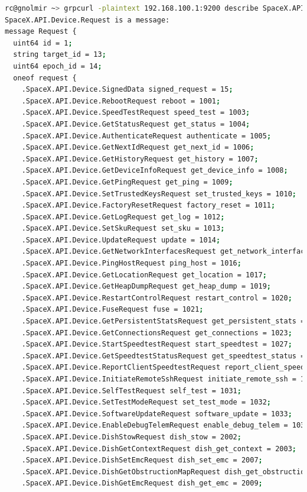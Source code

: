 \documentclass[IN,11pt,twoside,openright,bachelor,english]{tumthesis}
\begin{document}
\begin{lstlisting}[language=bash,basicstyle=\tiny]
rc@gnolmir ~> grpcurl -plaintext 192.168.100.1:9200 describe SpaceX.API.Device.Request
SpaceX.API.Device.Request is a message:
message Request {
  uint64 id = 1;
  string target_id = 13;
  uint64 epoch_id = 14;
  oneof request {
    .SpaceX.API.Device.SignedData signed_request = 15;
    .SpaceX.API.Device.RebootRequest reboot = 1001;
    .SpaceX.API.Device.SpeedTestRequest speed_test = 1003;
    .SpaceX.API.Device.GetStatusRequest get_status = 1004;
    .SpaceX.API.Device.AuthenticateRequest authenticate = 1005;
    .SpaceX.API.Device.GetNextIdRequest get_next_id = 1006;
    .SpaceX.API.Device.GetHistoryRequest get_history = 1007;
    .SpaceX.API.Device.GetDeviceInfoRequest get_device_info = 1008;
    .SpaceX.API.Device.GetPingRequest get_ping = 1009;
    .SpaceX.API.Device.SetTrustedKeysRequest set_trusted_keys = 1010;
    .SpaceX.API.Device.FactoryResetRequest factory_reset = 1011;
    .SpaceX.API.Device.GetLogRequest get_log = 1012;
    .SpaceX.API.Device.SetSkuRequest set_sku = 1013;
    .SpaceX.API.Device.UpdateRequest update = 1014;
    .SpaceX.API.Device.GetNetworkInterfacesRequest get_network_interfaces = 1015;
    .SpaceX.API.Device.PingHostRequest ping_host = 1016;
    .SpaceX.API.Device.GetLocationRequest get_location = 1017;
    .SpaceX.API.Device.GetHeapDumpRequest get_heap_dump = 1019;
    .SpaceX.API.Device.RestartControlRequest restart_control = 1020;
    .SpaceX.API.Device.FuseRequest fuse = 1021;
    .SpaceX.API.Device.GetPersistentStatsRequest get_persistent_stats = 1022;
    .SpaceX.API.Device.GetConnectionsRequest get_connections = 1023;
    .SpaceX.API.Device.StartSpeedtestRequest start_speedtest = 1027;
    .SpaceX.API.Device.GetSpeedtestStatusRequest get_speedtest_status = 1028;
    .SpaceX.API.Device.ReportClientSpeedtestRequest report_client_speedtest = 1029;
    .SpaceX.API.Device.InitiateRemoteSshRequest initiate_remote_ssh = 1030 [deprecated = true];
    .SpaceX.API.Device.SelfTestRequest self_test = 1031;
    .SpaceX.API.Device.SetTestModeRequest set_test_mode = 1032;
    .SpaceX.API.Device.SoftwareUpdateRequest software_update = 1033;
    .SpaceX.API.Device.EnableDebugTelemRequest enable_debug_telem = 1034;
    .SpaceX.API.Device.DishStowRequest dish_stow = 2002;
    .SpaceX.API.Device.DishGetContextRequest dish_get_context = 2003;
    .SpaceX.API.Device.DishSetEmcRequest dish_set_emc = 2007;
    .SpaceX.API.Device.DishGetObstructionMapRequest dish_get_obstruction_map = 2008;
    .SpaceX.API.Device.DishGetEmcRequest dish_get_emc = 2009;

\end{lstlisting}
\end{document}
